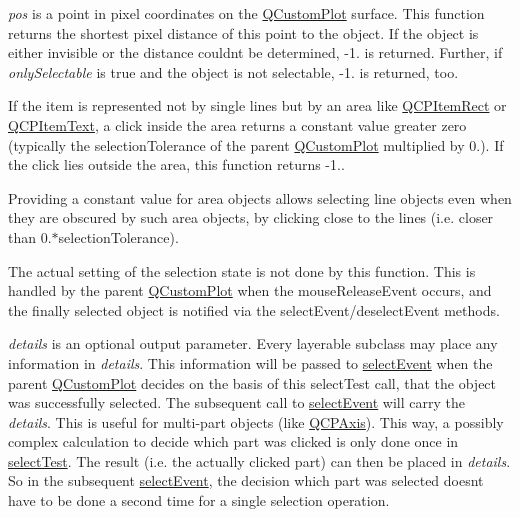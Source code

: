 {\itshape pos} is a point in pixel coordinates on the \hyperlink{class_q_custom_plot}{Q\+Custom\+Plot} surface. This function returns the shortest pixel distance of this point to the object. If the object is either invisible or the distance couldn\textquotesingle{}t be determined, -\/1. is returned. Further, if {\itshape only\+Selectable} is true and the object is not selectable, -\/1. is returned, too.

If the item is represented not by single lines but by an area like \hyperlink{class_q_c_p_item_rect}{Q\+C\+P\+Item\+Rect} or \hyperlink{class_q_c_p_item_text}{Q\+C\+P\+Item\+Text}, a click inside the area returns a constant value greater zero (typically the selection\+Tolerance of the parent \hyperlink{class_q_custom_plot}{Q\+Custom\+Plot} multiplied by 0.). If the click lies outside the area, this function returns -\/1..

Providing a constant value for area objects allows selecting line objects even when they are obscured by such area objects, by clicking close to the lines (i.\+e. closer than 0.$\ast$selection\+Tolerance).

The actual setting of the selection state is not done by this function. This is handled by the parent \hyperlink{class_q_custom_plot}{Q\+Custom\+Plot} when the mouse\+Release\+Event occurs, and the finally selected object is notified via the select\+Event/deselect\+Event methods.

{\itshape details} is an optional output parameter. Every layerable subclass may place any information in {\itshape details}. This information will be passed to \hyperlink{class_q_c_p_abstract_item_aaf92af7b9893712959a6c073d334d88d}{select\+Event} when the parent \hyperlink{class_q_custom_plot}{Q\+Custom\+Plot} decides on the basis of this select\+Test call, that the object was successfully selected. The subsequent call to \hyperlink{class_q_c_p_abstract_item_aaf92af7b9893712959a6c073d334d88d}{select\+Event} will carry the {\itshape details}. This is useful for multi-\/part objects (like \hyperlink{class_q_c_p_axis}{Q\+C\+P\+Axis}). This way, a possibly complex calculation to decide which part was clicked is only done once in \hyperlink{class_q_c_p_item_pixmap_a9f8436aa141fa0fb504191c882c2f4d9}{select\+Test}. The result (i.\+e. the actually clicked part) can then be placed in {\itshape details}. So in the subsequent \hyperlink{class_q_c_p_abstract_item_aaf92af7b9893712959a6c073d334d88d}{select\+Event}, the decision which part was selected doesn\textquotesingle{}t have to be done a second time for a single selection operation.

